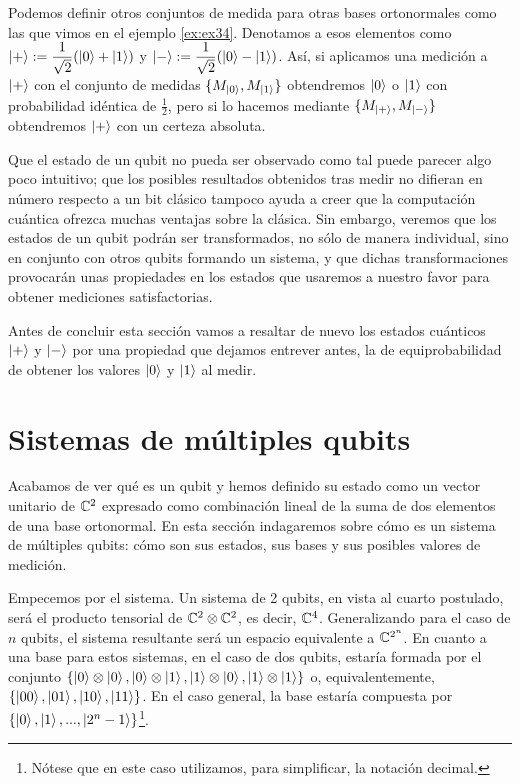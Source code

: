 Podemos definir otros conjuntos de medida para otras bases ortonormales como las que vimos en el ejemplo \ref{ex:ex34}. Denotamos a esos elementos como $\left|+\right\rangle:=\dfrac{1}{\sqrt{2}}(\left|0\right\rangle + \left|1\right\rangle)$ y $\left|-\right\rangle:=\dfrac{1}{\sqrt{2}}(\left|0\right\rangle - \left|1\right\rangle)$. Así, si aplicamos una medición a $\left|+\right\rangle$ con el conjunto de medidas $\{M_{\left|0\right\rangle},M_{\left|1\right\rangle}\}$ obtendremos $\left|0\right\rangle$ o $\left|1\right\rangle$ con probabilidad idéntica de $\frac{1}{2}$, pero si lo hacemos mediante $\{M_{\left|+\right\rangle},M_{\left|-\right\rangle}\}$ obtendremos $\left|+\right\rangle$ con un certeza absoluta.

Que el estado de un qubit no pueda ser observado como tal puede parecer algo poco intuitivo; que los posibles resultados obtenidos tras medir no difieran en número respecto a un bit clásico tampoco ayuda a creer que la computación cuántica ofrezca muchas ventajas sobre la clásica. Sin embargo, veremos que los estados de un qubit podrán ser transformados, no sólo de manera individual, sino en conjunto con otros qubits formando un sistema, y que dichas transformaciones provocarán unas propiedades en los estados que usaremos a nuestro favor para obtener mediciones satisfactorias.

Antes de concluir esta sección vamos a resaltar de nuevo los estados cuánticos $\left|+\right\rangle$ y $\left|-\right\rangle$ por una propiedad que dejamos entrever antes, la de equiprobabilidad de obtener los valores $\left|0\right\rangle$ y $\left|1\right\rangle$ al medir.


\section{Sistemas de múltiples qubits}

Acabamos de ver qué es un qubit y hemos definido su estado como un vector unitario de $\mathbb{C}^2$ expresado como combinación lineal de la suma de dos elementos de una base ortonormal. En esta sección indagaremos sobre cómo es un sistema de múltiples qubits: cómo son sus estados, sus bases y sus posibles valores de medición.

Empecemos por el sistema. Un sistema de 2 qubits, en vista al cuarto postulado, será el producto tensorial de $\mathbb{C}^2\otimes\mathbb{C}^2$, es decir, $\mathbb{C}^4$. Generalizando para el caso de $n$ qubits, el sistema resultante será un espacio equivalente a $\mathbb{C}^{2^n}$. En cuanto a una base para estos sistemas, en el caso de dos qubits, estaría formada por el conjunto $\{\left|0\right\rangle\otimes\left|0\right\rangle,\left|0\right\rangle\otimes\left|1\right\rangle,\left|1\right\rangle\otimes\left|0\right\rangle,\left|1\right\rangle\otimes\left|1\right\rangle\}$ o, equivalentemente, $\{\left|00\right\rangle,\left|01\right\rangle,\left|10\right\rangle,\left|11\right\rangle\}$. En el caso general, la base estaría compuesta por $\{\left|0\right\rangle,\left|1\right\rangle,...,\left|2^n-1\right\rangle\}$\footnote{Nótese que en este caso utilizamos, para simplificar, la notación decimal.}.

